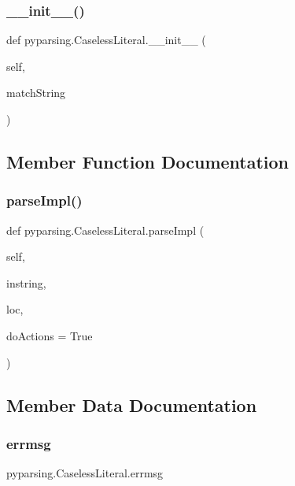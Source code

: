 \subsubsection{\texorpdfstring{\+\_\+\+\_\+init\+\_\+\+\_\+()}{\_\_init\_\_()}}
{\footnotesize\ttfamily def pyparsing.\+Caseless\+Literal.\+\_\+\+\_\+init\+\_\+\+\_\+ (\begin{DoxyParamCaption}\item[{}]{self,  }\item[{}]{match\+String }\end{DoxyParamCaption})}



\subsection{Member Function Documentation}
\mbox{\label{classpyparsing_1_1CaselessLiteral_adb4c6e765063910162d230a3b86d5108}} 
\subsubsection{\texorpdfstring{parse\+Impl()}{parseImpl()}}
{\footnotesize\ttfamily def pyparsing.\+Caseless\+Literal.\+parse\+Impl (\begin{DoxyParamCaption}\item[{}]{self,  }\item[{}]{instring,  }\item[{}]{loc,  }\item[{}]{do\+Actions = {\ttfamily True} }\end{DoxyParamCaption})}



\subsection{Member Data Documentation}
\mbox{\label{classpyparsing_1_1CaselessLiteral_a87727a9853340009653772b490119080}} 
\subsubsection{\texorpdfstring{errmsg}{errmsg}}
{\footnotesize\ttfamily pyparsing.\+Caseless\+Literal.\+errmsg}

